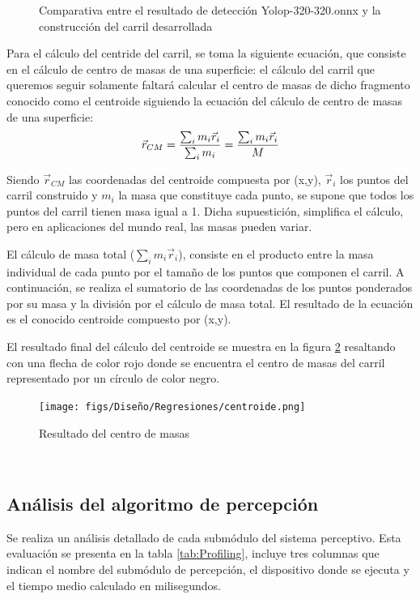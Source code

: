 \begin{figure}[H]
  \caption{Comparativa entre el resultado de detección Yolop-320-320.onnx y la construcción del carril desarrollada}
  \label{comparativa-interpolacion}
\end{figure}

Para el cálculo del centride del carril, se toma la siguiente ecuación, que consiste en el cálculo de centro de masas de una superficie: \newline
el cálculo del carril que queremos seguir solamente faltará calcular el centro de masas de dicho fragmento conocido como el centroide siguiendo la ecuación
del cálculo de centro de masas de una superficie: 
  \begin{equation} 
    \vec{r}_{CM} = \frac{\sum_{i}m_{i} \vec{r}_{i}}{\sum_{i}m_{i}} = \frac{\sum_{i}m_{i} \vec{r}_{i}}{M} 
    \newline
  \end{equation} 

  Siendo $\vec{r}_{CM}$ las coordenadas del centroide compuesta por (x,y), $\vec{r}_{i}$ los puntos del carril construido y $m_{i}$ la masa que constituye cada punto, se supone que todos 
  los puntos del carril tienen masa igual a 1. Dicha supuestición, simplifica el cálculo, pero en aplicaciones del mundo real, las masas pueden variar. 

  El cálculo de masa total ($\sum_{i}m_{i} \vec{r}_{i}$), consiste en el producto entre la masa individual de cada punto por el tamaño de los puntos que componen el carril. A continuación, 
  se realiza el sumatorio de las coordenadas de los puntos ponderados por su masa y la división por el cálculo de masa total. El resultado de la ecuación es el conocido centroide 
  compuesto por (x,y). \newline
  
  El resultado final del cálculo del centroide se muestra en la figura \ref{fig:centro de masas} resaltando con una flecha de color rojo donde se encuentra
  el centro de masas del carril representado por un círculo de color negro.

  \begin{figure} [H]
    \begin{center}
      \texttt{[image: figs/Diseño/Regresiones/centroide.png]}
    \end{center}
    \caption{Resultado del centro de masas}
    \label{fig:centro de masas}
  \end{figure}\

  \subsection{Análisis del algoritmo de percepción}
  \label{sec:Análisis del algoritmo de percepción}
  Se realiza un análisis detallado de cada submódulo del sistema perceptivo. Esta evaluación se presenta en la tabla \ref{tab:Profiling}, incluye 
  tres columnas que indican el nombre del submódulo de percepción, el dispositivo donde se ejecuta y el tiempo medio calculado en milisegundos.

